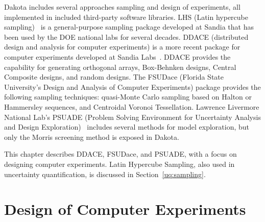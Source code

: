 Dakota includes several approaches sampling and design of experiments,
all implemented in included third-party software libraries. LHS
(Latin hypercube sampling)~\cite{Swi04} is a general-purpose sampling
package developed at Sandia that has been used by the DOE national
labs for several decades. DDACE (distributed design and analysis for
computer experiments) is a more recent package for computer
experiments developed at Sandia Labs~\cite{TonXX}. DDACE provides the
capability for generating orthogonal arrays, Box-Behnken designs,
Central Composite designs, and random designs. The FSUDace (Florida
State University's Design and Analysis of Computer Experiments)
package provides the following sampling techniques: quasi-Monte Carlo
sampling based on Halton or Hammersley sequences, and Centroidal
Voronoi Tessellation. Lawrence Livermore National Lab's PSUADE
(Problem Solving Environment for Uncertainty Analysis and Design
Exploration)~\cite{Ton05} includes several methods for model
exploration, but only the Morris screening method is exposed in
Dakota.

This chapter describes DDACE, FSUDace, and PSUADE, with a focus on
designing computer experiments. Latin Hypercube Sampling, also used in
uncertainty quantification, is discussed in Section~\ref{uq:sampling}.
\begin{comment}
The differences between sampling used in design of experiments and
sampling used in uncertainty quantification is discussed in more
detail in the following paragraphs. In brief, we consider design of
experiment methods to generate sets of uniform random variables on the
interval $[0,1]$. These sets are mapped to the lower/upper bounds of
the problem variables and then the response functions are evaluated at
the sample input points with the goal of characterizing the behavior
of the response functions over the input parameter ranges of
interest. Uncertainty quantification via LHS sampling, in contrast,
involves characterizing the uncertain input variables with probability
distributions such as normal, Weibull, triangular, etc., sampling from
the input distributions, and propagating the input uncertainties to
obtain a cumulative distribution function on the output. There is
significant overlap between design of experiments and sampling. Often,
both techniques can be used to obtain similar results about the
behavior of the response functions and about the relative importance
of the input variables.
\end{comment}

\section{Design of Computer Experiments}\label{dace:background}

